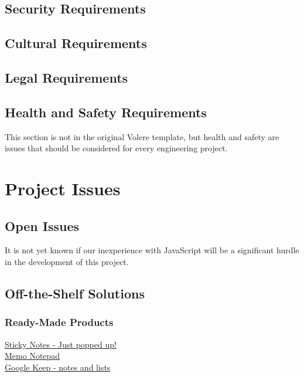 \documentclass[12pt, titlepage]{article}
\begin{document}
\subsection{Security Requirements}

\subsection{Cultural Requirements}

\subsection{Legal Requirements}

\subsection{Health and Safety Requirements}

This section is not in the original Volere template, but health and safety are
issues that should be considered for every engineering project.

\section{Project Issues}

\subsection{Open Issues}
It is not yet known if our inexperience with JavaScript will be a significant hurdle in the development of this project.

\subsection{Off-the-Shelf Solutions}
\subsubsection{Ready-Made Products}
	\href{https://chrome.google.com/webstore/detail/sticky-notes-just-popped/plpdjbappofmfbgdmhoaabefbobddchk}
	{Sticky Notes - Just popped up!}\\
	\href{https://chrome.google.com/webstore/detail/memo-notepad/nmoihkoninaoanjobiiknmgenhpaecec}
	{Memo Notepad}\\
	\href{https://chrome.google.com/webstore/detail/google-keep-notes-and-lis/hmjkmjkepdijhoojdojkdfohbdgmmhki?hl=en}
	{Google Keep - notes and lists}
	
\end{document}
